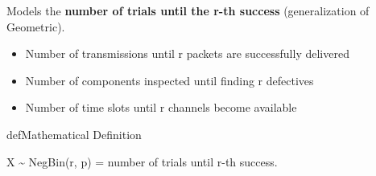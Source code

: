 \begin{Shaded}
\begin{Highlighting}[]
\NormalTok{(}\OperatorTok{,}\OperatorTok{,}\NormalTok{)}\OperatorTok{;}
\NormalTok{(}\OperatorTok{,} \OperatorTok{,} \OperatorTok{,} \OperatorTok{,} \NormalTok{)}\OperatorTok{;}
\NormalTok{(}\NormalTok{)}\OperatorTok{;} \NormalTok{(}\NormalTok{)}\OperatorTok{;}
\NormalTok{(}\NormalTok{)}\OperatorTok{;}
 \OperatorTok{;}

\NormalTok{(}\OperatorTok{,} \OperatorTok{/}\OperatorTok{,} \NormalTok{(}\NormalTok{))}\OperatorTok{;}
\end{Highlighting}
\end{Shaded}



Models the \textbf{number of trials until the r-th success} (generalization of Geometric).


\begin{itemize}
\tightlist
\item
  Number of transmissions until r packets are successfully delivered
\item
  Number of components inspected until finding r defectives
\item
  Number of time slots until r channels become available
\end{itemize}

\begin{PSbox}[unbreakable]{def}{Mathematical Definition}

X \textasciitilde{} NegBin(r, p) = number of trials until r-th success.

\end{PSbox}

